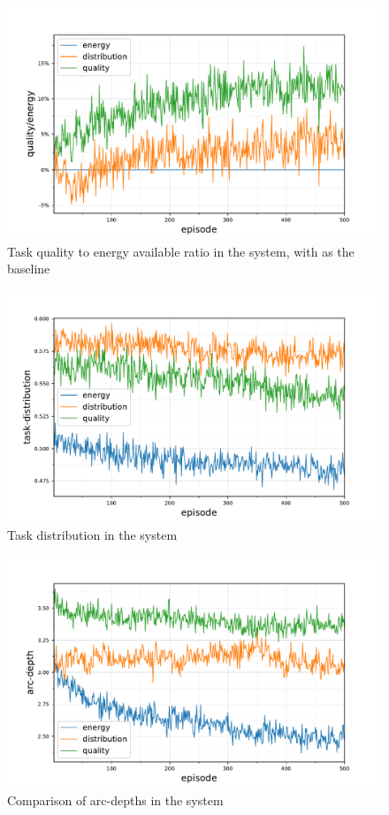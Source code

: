 \begin{figure}
	\centering
	\includegraphics[width=0.7\linewidth]{5.19_ctv-quality-energy-baseline-comparison}
	\caption{Task quality to energy available ratio in the \simulationExtended{}{} system, with \algorithmEnergy{}{} as the baseline}
	\label{fig:ctv-quality-energy-baseline-comparison}
\end{figure}
\begin{figure}
	\centering
	\includegraphics[width=0.7\linewidth]{5.19_ctv-task-distribution-comparison}
	\caption{Task distribution in the \simulationExtended{}{} system}
	\label{fig:ctv-task-distribution-comparison}
\end{figure}
\begin{figure}
	\centering
	\includegraphics[width=0.7\linewidth]{5.19_ctv-arc-depth-comparison}
	\caption{Comparison of arc-depths in the \simulationExtended{}{} system}
	\label{fig:ctv-arc-depth-comparison}
\end{figure}

